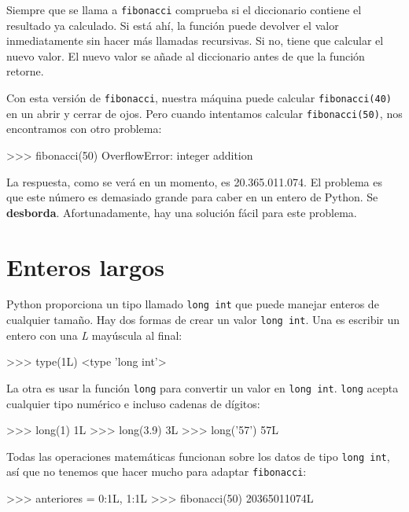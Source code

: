Siempre que se llama a \texttt{fibonacci} comprueba si el diccionario
contiene el resultado ya calculado. Si está ahí, la función puede
devolver el valor inmediatamente sin hacer más llamadas recursivas.
Si no, tiene que calcular el nuevo valor. El nuevo valor se añade
al diccionario antes de que la función retorne.

Con esta versión de \texttt{fibonacci}, nuestra máquina puede calcular
\texttt{fibonacci(40)} en un abrir y cerrar de ojos. Pero cuando intentamos
calcular \texttt{fibonacci(50)}, nos encontramos con otro problema:

 

\begin{pyconcode}
>>> fibonacci(50)
OverflowError: integer addition
\end{pyconcode}

La respuesta, como se verá en un momento, es 20.365.011.074. El problema
es que este número es demasiado grande para caber en un entero de
Python. Se \textbf{desborda}. Afortunadamente, hay una solución fácil
para este problema.

\section{Enteros largos}

  

Python proporciona un tipo llamado \texttt{long int} que puede manejar
enteros de cualquier tamaño. Hay dos formas de crear un valor \texttt{long
int}. Una es escribir un entero con una {\em L} mayúscula al final:

\begin{pyconcode}
>>> type(1L)
<type 'long int'>
\end{pyconcode}
 La otra es usar la función \texttt{long} para convertir un valor
en \texttt{long int}. \texttt{long} acepta cualquier tipo numérico
e incluso cadenas de dígitos:
\begin{pyconcode}
>>> long(1)
1L
>>> long(3.9)
3L
>>> long('57')
57L
\end{pyconcode}

Todas las operaciones matemáticas funcionan sobre los datos de tipo
\texttt{long int}, así que no tenemos que hacer mucho para adaptar
\texttt{fibonacci}:
\begin{pyconcode}
>>> anteriores = {0:1L, 1:1L}
>>> fibonacci(50)
20365011074L
\end{pyconcode}

